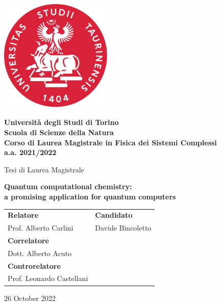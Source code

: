 \begin{titlepage}
   \begin{center}

       \includegraphics[width=0.4\textwidth]{figures/UniTO Logo nuovo.png}
       \vspace{1cm}
       
       \textbf{
       Università degli Studi di Torino\\
       Scuola di Scienze della Natura\\
       Corso di Laurea Magistrale in Fisica dei Sistemi Complessi\\
       a.a. 2021/2022
       }
       \vspace{1.5cm}
       
       Tesi di Laurea Magistrale
       \vspace{0.5cm}
       
       {\LARGE\textbf{Quantum computational chemistry:} \\
        \vspace{0.2cm}
       \large\textbf{a promising application for quantum computers}}
       \vspace{3cm}
       
       \begin{tabularx}{\linewidth}{@{}X >{\raggedleft\arraybackslash}X@{}}
       \textbf{Relatore} & \textbf{Candidato} \\
       Prof. Alberto Carlini & Davide Bincoletto \\
       \textbf{Correlatore} \\
       Dott. Alberto Acuto \\
       \textbf{Controrelatore} \\
       Prof. Leonardo Castellani
       \end{tabularx}
       \vspace{2cm}
       
       26 October 2022
       
       
   \end{center}
\end{titlepage}